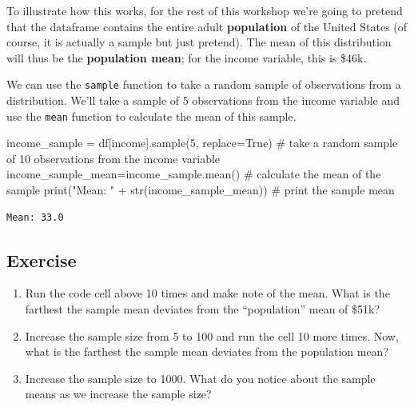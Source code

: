 \documentclass[
  letterpaper,
  DIV=11,
  numbers=noendperiod]{scrreprt}
\newenvironment{Shaded}{\begin{snugshade}}{\end{snugshade}}
\newcommand{\BuiltInTok}[1]{\textcolor[rgb]{0.00,0.23,0.31}{#1}}
\newcommand{\CommentTok}[1]{\textcolor[rgb]{0.37,0.37,0.37}{#1}}
\newcommand{\DecValTok}[1]{\textcolor[rgb]{0.68,0.00,0.00}{#1}}
\newcommand{\NormalTok}[1]{\textcolor[rgb]{0.00,0.23,0.31}{#1}}
\newcommand{\OperatorTok}[1]{\textcolor[rgb]{0.37,0.37,0.37}{#1}}
\newcommand{\StringTok}[1]{\textcolor[rgb]{0.13,0.47,0.30}{#1}}
\newcommand{\VariableTok}[1]{\textcolor[rgb]{0.07,0.07,0.07}{#1}}
\providecommand{\tightlist}{%
  \setlength{\itemsep}{0pt}\setlength{\parskip}{0pt}}\usepackage{longtable,booktabs,array}
\begin{document}
To illustrate how this works, for the rest of this workshop we're going
to pretend that the dataframe contains the entire adult
\textbf{population} of the United States (of course, it is actually a
sample but just pretend). The mean of this distribution will thus be the
\textbf{population mean}; for the income variable, this is \$46k.

We can use the \texttt{sample} function to take a random sample of
observations from a distribution. We'll take a sample of 5 observations
from the income variable and use the \texttt{mean} function to calculate
the mean of this sample.

\begin{Shaded}
\begin{Highlighting}[]
\NormalTok{income\_sample }\OperatorTok{=}\NormalTok{ df[}\StringTok{\textquotesingle{}income\textquotesingle{}}\NormalTok{].sample(}\DecValTok{5}\NormalTok{, replace}\OperatorTok{=}\VariableTok{True}\NormalTok{) }\CommentTok{\# take a random sample of 10 observations from the income variable}
\NormalTok{income\_sample\_mean}\OperatorTok{=}\NormalTok{income\_sample.mean() }\CommentTok{\# calculate the mean of the sample}
\BuiltInTok{print}\NormalTok{(}\StringTok{"Mean: "} \OperatorTok{+} \BuiltInTok{str}\NormalTok{(income\_sample\_mean)) }\CommentTok{\# print the sample mean}
\end{Highlighting}
\end{Shaded}

\begin{verbatim}
Mean: 33.0
\end{verbatim}

\hypertarget{exercise-14}{%
\subsection{Exercise}\label{exercise-14}}

\begin{enumerate}
\def\labelenumi{\arabic{enumi}.}
\tightlist
\item
  Run the code cell above 10 times and make note of the mean. What is
  the farthest the sample mean deviates from the ``population'' mean of
  \$51k?
\item
  Increase the sample size from 5 to 100 and run the cell 10 more times.
  Now, what is the farthest the sample mean deviates from the population
  mean?
\item
  Increase the sample size to 1000. What do you notice about the sample
  means as we increase the sample size?
\end{enumerate}
\end{document}
